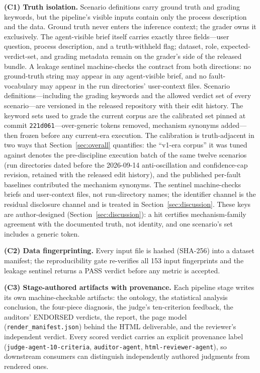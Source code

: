 \documentclass[preprint,10pt]{elsarticle}
\begin{document}
\textbf{(C1) Truth isolation.} Scenario definitions carry ground truth and grading keywords, but the pipeline's visible inputs contain only the process description and the data. Ground truth never enters the inference context; the grader owns it exclusively. The agent-visible brief itself carries exactly three fields---user question, process description, and a truth-withheld flag; dataset, role, expected-verdict-set, and grading metadata remain on the grader's side of the released bundle. A leakage sentinel machine-checks the contract from both directions: no ground-truth string may appear in any agent-visible brief, and no fault-vocabulary may appear in the run directories' user-context files. Scenario definitions---including the grading keywords and the allowed verdict set of every scenario---are versioned in the released repository with their edit history. The keyword sets used to grade the current corpus are the calibrated set pinned at commit \texttt{221d061}---over-generic tokens removed, mechanism synonyms added---then frozen before any current-era execution. The calibration is truth-adjacent in two ways that Section~\ref{sec:overall} quantifies: the ``v1-era corpus'' it was tuned against denotes the pre-discipline execution batch of the same twelve scenarios (run directories dated before the 2026-09-14 anti-oscillation and confidence-cap revision, retained with the released edit history), and the published per-fault baselines contributed the mechanism synonyms. The sentinel machine-checks briefs and user-context files, not run-directory names; the identifier channel is the residual disclosure channel and is treated in Section~\ref{sec:discussion}. These keys are author-designed (Section~\ref{sec:discussion}): a hit certifies mechanism-family agreement with the documented truth, not identity, and one scenario's set includes a generic token.

\textbf{(C2) Data fingerprinting.} Every input file is hashed (SHA-256) into a dataset manifest; the reproducibility gate re-verifies all 153 input fingerprints and the leakage sentinel returns a PASS verdict before any metric is accepted.

\textbf{(C3) Stage-authored artifacts with provenance.} Each pipeline stage writes its own machine-checkable artifacts: the ontology, the statistical analysis conclusion, the four-piece diagnosis, the judge's ten-criterion feedback, the auditors' ENDORSED verdicts, the report, the page model (\texttt{render\_manifest.json}) behind the HTML deliverable, and the reviewer's independent verdict. Every scored verdict carries an explicit provenance label (\texttt{judge-agent-10-criteria}, \texttt{auditor-agent}, \texttt{html-reviewer-agent}), so downstream consumers can distinguish independently authored judgments from rendered ones.
\end{document}
